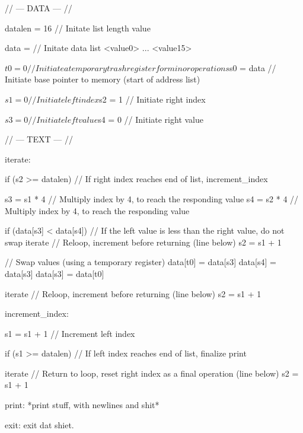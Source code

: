
// --- DATA ---	//

	datalen = 16	// Initate list length value
	
	data = 			// Initate data list
	<value0>	
	...
	<value15>

	$t0 = 0		// Initiate a temporary trash register for minor operations
	
	$s0 = data	// Initiate base pointer to memory (start of address list)
	
	$s1	= 0		// Initiate left index
	$s2 = 1		// Initiate right index
	
	$s3	= 0		// Initiate left value
	$s4 = 0		// Initiate right value
	
	
// --- TEXT --- //

	
iterate:
	
	if (s2 >= datalen)		// If right index reaches end of list,
		increment_index
	
	s3 = s1 * 4				// Multiply index by 4, to reach the responding value
	s4 = s2 * 4				// Multiply index by 4, to reach the responding value
	
	if (data[s3] < data[s4])	// If the left value is less than the right value, do not swap
		iterate					// Reloop, increment before returning (line below)
		s2 = s1 + 1

	// Swap values (using a temporary register)
	data[t0] = data[s3]
	data[s4] = data[s3]
	data[s3] = data[t0]		
	
	iterate					// Reloop, increment before returning (line below)
	s2 = s1 + 1

increment_index:
	
		s1 = s1 + 1			// Increment left index
			
		if (s1 >= datalen)	// If left index reaches end of list, finalize
			print
		
		iterate				// Return to loop, reset right index as a final operation (line below)
		s2 = s1 + 1
	
print:
	*print stuff, with newlines and shit*
	
exit:
	exit dat shiet.